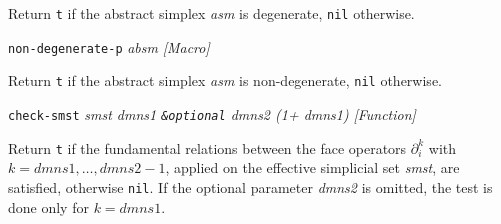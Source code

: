{{\leftskip=15mm 
Return {\tt t} if the abstract simplex {\em asm} is degenerate, {\tt nil} otherwise. \par}
{\leftskip=5mm 
{\tt non-degenerate-p} {\em  absm} \hfill {\em [Macro]} \par}
{\leftskip=15mm 
Return {\tt t} if the abstract simplex {\em asm} is non-degenerate, {\tt nil} otherwise. \par}
{\leftskip=5mm 
{\tt check-smst} {\em smst dmns1 {\tt \&optional} dmns2 (1+ dmns1)} \hfill {\em [Function]}  \par}
{\leftskip=15mm 
Return {\tt t} if the fundamental relations between the face operators $\partial_i^k$
with $k=dmns1,\ldots, dmns2-1$,
applied on the effective simplicial set {\em smst}, are satisfied, otherwise {\tt nil}.
If the optional parameter {\em dmns2} is omitted, the test is done only for
$k=dmns1$. \par}
}

